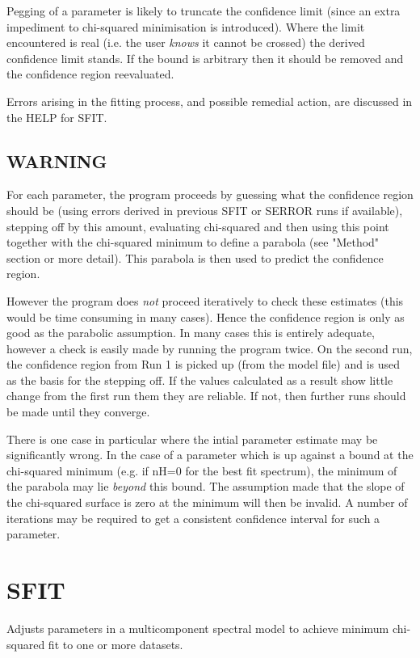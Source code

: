 \documentclass{book}
\renewcommand{\_}{{\tt\char'137}}     %
\begin{document}
Pegging of a parameter is likely to truncate the confidence limit
(since an extra impediment to chi-squared minimisation is
introduced). Where the limit encountered is real (i.e. the user
{\em knows} it cannot be crossed) the derived confidence limit stands.
If the bound is arbitrary then it should be removed and the
confidence region reevaluated.
 
Errors arising in the fitting process, and possible remedial
action, are discussed in the HELP for SFIT.
 
\subsection{WARNING}
For each parameter, the program proceeds by guessing what the
confidence region should be (using errors derived in previous
SFIT or SERROR runs if available), stepping off by this amount,
evaluating chi-squared and then using this point together with
the chi-squared minimum to define a parabola (see "Method" section
or more detail). This parabola is then used to predict the
confidence region.
 
However the program does {\em not} proceed iteratively to check these
estimates (this would be time consuming in many cases). Hence
the confidence region is only as good as the parabolic assumption.
In many cases this is entirely adequate, however a check is easily
made by running the program twice. On the second run, the confidence
region from Run 1 is picked up (from the model file) and is used
as the basis for the stepping off. If the values calculated as a
result show little change from the first run them they are reliable.
If not, then further runs should be made until they converge.
 
There is one case in particular where the intial parameter estimate
may be significantly wrong. In the case of a parameter which is up
against a bound at the chi-squared minimum (e.g. if nH=0 for the
best fit spectrum), the minimum of the parabola may lie
{\em beyond} this bound. The assumption made that the slope of the
chi-squared surface is zero at the minimum will then be invalid. A
number of iterations may be required to get a consistent confidence
interval for such a parameter.
 
\section{SFIT}
Adjusts parameters in a multicomponent spectral model to achieve
minimum chi-squared fit to one or more datasets.
 
\end{document}
